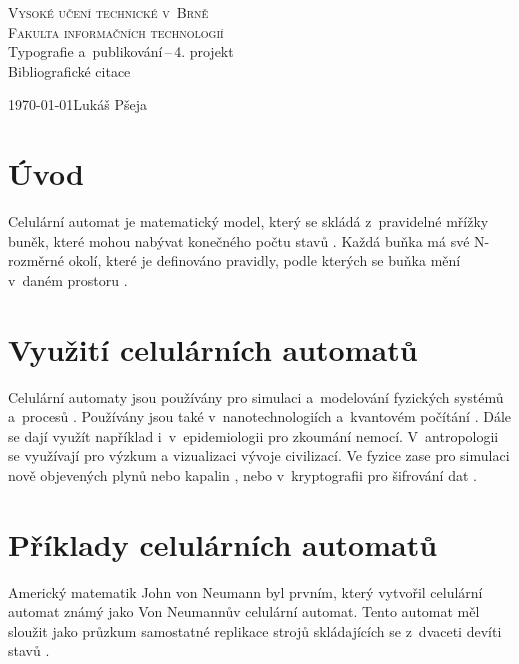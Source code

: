 \documentclass[11pt]{article}
\begin{document}
\begin{titlepage}
    \begin{center}
        \textsc{\Huge Vysoké učení technické v~Brně}\\
        \medskip
        \textsc{\huge Fakulta informačních technologií}\\
        \bigskip
        {\LARGE Typografie a~publikování\,--\,4. projekt}\\
        \medskip
        {\Huge Bibliografické citace}
    \end{center}
    {\Large \today \hfill Lukáš Pšeja}\\\null
\end{titlepage}

\section*{Úvod}
    Celulární automat je matematický model, který se skládá z~pravidelné mřížky buněk, které mohou nabývat konečného počtu stavů \cite{diplomka}. Každá buňka má své N-rozměrné okolí, které je definováno pravidly, podle kterých se buňka mění v~daném prostoru \cite{celularni_automaty}. 

\section*{Využití celulárních automatů}
    Celulární automaty jsou používány pro simulaci a~modelování fyzických systémů a~procesů \cite{casopis}. Používány jsou také v~nanotechnologiích a~kvantovém počítání \cite{article_automated_design}. Dále se dají využít například i~v~epidemiologii pro zkoumání nemocí. V~antropologii se využívají pro výzkum a vizualizaci vývoje civilizací. Ve fyzice zase pro simulaci nově objevených plynů nebo kapalin \cite{online_ca}, nebo v~kryptografii pro šifrování dat \cite{bakalarka}.

\section*{Příklady celulárních automatů}
    Americký matematik John von Neumann byl prvním, který vytvořil celulární automat známý jako Von Neumannův celulární automat. Tento automat měl sloužit jako průzkum samostatné replikace strojů skládajících se z~dvaceti devíti stavů \cite{analyza_a_aplikace}.
\end{document}
